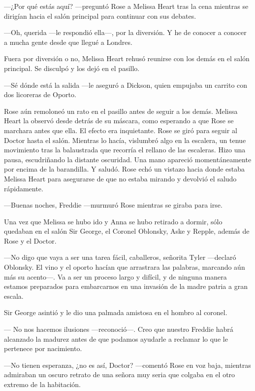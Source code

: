 {---¿Por qué estás aquí? ---preguntó Rose a Melissa Heart tras la cena
	mientras se dirigían hacia el salón principal para continuar con sus
debates.}

{---Oh, querida ---le respondió ella---, por la diversión. Y he de
conocer a conocer a mucha gente desde que llegué a Londres.}

{Fuera por diversión o no, Melissa Heart rehusó reunirse con los demás
en el salón principal. Se disculpó y los dejó en el pasillo.}

{---Sé dónde está la salida ---le aseguró a Dickson, quien empujaba un
carrito con dos licoreras de Oporto.}

{Rose aún remoloneó un rato en el pasillo antes de seguir a los demás.
	Melissa Heart la observó desde detrás de su máscara, como esperando a
	que Rose se marchara antes que ella. El efecto era inquietante. Rose se
	giró para seguir al Doctor hasta el salón. Mientras lo hacía, vislumbró
	algo en la escalera, un tenue movimiento tras la balaustrada que
	recorría el rellano de las escaleras. Hizo una pausa, escudriñando la
	distante oscuridad. Una mano apareció momentáneamente por encima de la
	barandilla. Y saludó. Rose echó un vistazo hacia donde estaba Melissa
	Heart para asegurarse de que no estaba mirando y devolvió el saludo
rápidamente.}

{---Buenas noches, Freddie ---murmuró Rose mientras se giraba para
irse.}

{Una vez que Melissa se hubo ido y Anna se hubo retirado a dormir, sólo
	quedaban en el salón Sir George, el Coronel Oblonsky, Aske y Repple,
además de Rose y el Doctor.}

{---No digo que vaya a ser una tarea fácil, caballeros, señorita Tyler
	---declaró Oblonsky. El vino y el oporto hacían que arrastrara las
	palabras, marcando aún más su acento---. Va a ser un proceso largo y
	difícil, y de ninguna manera estamos preparados para embarcarnos en una
invasión de la madre patria a gran escala.}

{Sir George asintió y le dio una palmada amistosa en el hombro al
coronel.}

{--- No nos hacemos ilusiones ---reconoció---. Creo que nuestro Freddie
	habrá alcanzado la madurez antes de que podamos ayudarle a reclamar lo
que le pertenece por nacimiento.}

{---No tienen esperanza, ¿no es así, Doctor? ---comentó Rose en voz
	baja, mientras admiraban un oscuro retrato de una señora muy seria que
colgaba en el otro extremo de la habitación.}

